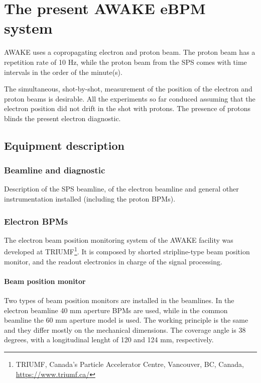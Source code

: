 \chapter[The present AWAKE eBPM system]{The present AWAKE eBPM system}

AWAKE uses a copropagating electron and proton beam. The proton beam has a repetition rate of 10 Hz, while the proton beam from the SPS comes with time intervals in the order of the minute(s).

The simultaneous, shot-by-shot, measurement of the position of the electron and proton beams is desirable. All the experiments so far conduced assuming that the electron position did not drift in the shot with protons. The presence of protons blinds the present electron diagnostic.

\section[Equipment description]{Equipment description}

\subsection[Beamline and diagnostic]{Beamline and diagnostic}

Description of the SPS beamline, of the electron beamline and general other instrumentation installed (including the proton BPMs).

\subsection[Electron BPMs]{Electron BPMs}

The electron beam position monitoring system of the AWAKE facility was developed at TRIUMF\footnote{TRIUMF, Canada's Particle Accelerator Centre, Vancouver, BC, Canada, \url{https://www.triumf.ca/}}. It is composed by shorted stripline-type beam position monitor, and the readout electronics in charge of the signal processing.

\subsubsection{Beam position monitor}

Two types of beam position monitors are installed in the beamlines. In the electron beamline 40 mm aperture BPMs are used, while in the common beamline the 60 mm aperture model is used. The working principle is the same and they differ mostly on the mechanical dimensions. The coverage angle is 38 degrees, with a longitudinal lenght of 120 and 124 mm, respectively.


